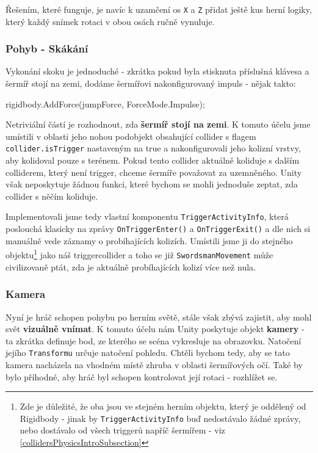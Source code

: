Řešením, které funguje, je navíc k uzamčení os \texttt{X} a \texttt{Z} přidat ještě kus herní logiky, který každý snímek rotaci v obou osách ručně vynuluje.

\subsubsection*{Pohyb - Skákání}

Vykonání skoku je jednoduché - zkrátka pokud byla stisknuta příslušná klávesa a šermíř stojí na zemi, dodáme šermířovi nakonfigurovaný impuls - nějak takto:

\begin{code}
 rigidbody.AddForce(jumpForce, ForceMode.Impulse);
\end{code}

Netriviální částí je rozhodnout, zda \textbf{šermíř stojí na zemi}. K tomuto účelu jsme umístili v oblasti jeho nohou podobjekt obsahující collider s flagem \texttt{collider.isTrigger} nastaveným na true a nakonfigurovali jeho kolizní vrstvy, aby kolidoval pouze s terénem. Pokud tento collider aktuálně koliduje s dalším colliderem, který není trigger, chceme šermíře považovat za uzemněného. Unity však neposkytuje žádnou funkci, které bychom se mohli jednoduše zeptat, zda collider s něčím koliduje. 

Implementovali jsme tedy vlastní komponentu \texttt{TriggerActivityInfo}, která poslouchá klasicky na zprávy \texttt{OnTriggerEnter()} a \texttt{OnTriggerExit()} a dle nich si manuálně vede záznamy o probíhajících kolizích. Umístili jsme ji do stejného objektu\footnote{Zde je důležité, že oba jsou ve stejném herním objektu, který je oddělený od Rigidbody - jinak by \texttt{TriggerActivityInfo} buď nedostávalo žádné zprávy, nebo dostávalo od všech triggerů napříč šermířem - viz \ref{collidersPhysicsIntroSubsection}} jako náš triggercollider a toho se již \texttt{SwordsmanMovement} může civilizovaně ptát, zda je aktuálně probíhajících kolizí více než nula.

\subsubsection*{Kamera}

Nyní je hráč schopen pohybu po herním světě, stále však zbývá zajistit, aby mohl svět \textbf{vizuálně vnímat}. K tomuto účelu nám Unity poskytuje objekt \textbf{kamery} - ta zkrátka definuje bod, ze kterého se scéna vykresluje na obrazovku. Natočení jejího \texttt{Transformu} určuje natočení pohledu. Chtěli bychom tedy, aby se tato kamera nacházela na vhodném místě zhruba v oblasti šermířových očí. Také by bylo příhodné, aby hráč byl schopen kontrolovat její rotaci - rozhlížet se.

